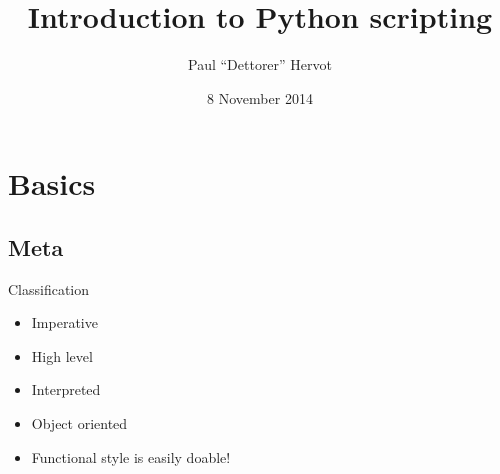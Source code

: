 \documentclass[ignorenonframetext,]{beamer}
\title{Introduction to Python scripting}
\author{Paul ``Dettorer'' Hervot}
\date{8 November 2014}
\begin{document}
\frame{\titlepage}

\frame{\tableofcontents}

\section{Basics}
\subsection{Meta}

\begin{frame}{Classification}
    \begin{itemize}
        \item Imperative
        \item High level
        \item Interpreted
        \item Object oriented
        \item Functional style is easily doable!
    \end{itemize}
\end{frame}
\end{document}

